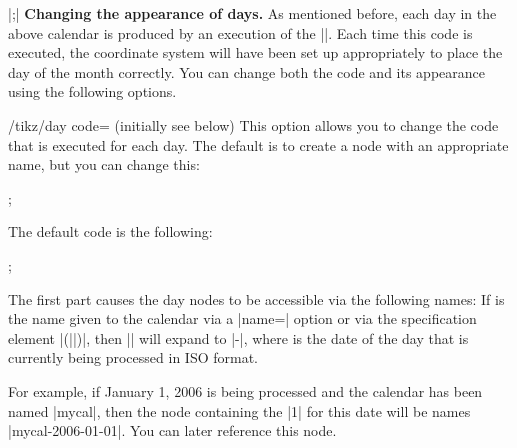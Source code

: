 \begin{command}{\calendar {}|;|}
    \medskip
    \textbf{Changing the appearance of days.}
    As mentioned before, each day in the above calendar is produced by an
    execution of the |\tikzdaycode|. Each time this code is executed, the
    coordinate system will have been set up appropriately to place the day of
    the month correctly. You can change both the code and its appearance using
    the following options.
    \begin{key}{/tikz/day code= (initially \normalfont see below)}
        This option allows you to change the code that is executed for each
        day. The default is to create a node with an appropriate name, but you
        can change this:
\begin{codeexample}[preamble={\usetikzlibrary{calendar}}]
\tikz \calendar[dates=2000-01-01 to 2000-01-31,week list,
                day code={\fill[blue] (0,0) circle (2pt);}];
\end{codeexample}
        The default code is the following:
\begin{codeexample}
\node[name=\pgfcalendarsuggestedname,every day]{\tikzdaytext};
\end{codeexample}
        The first part causes the day nodes to be accessible via the following
        names: If  is the name given to the calendar via a |name=|
        option or via the specification element |(||)|, then
        |\pgfcalendarsuggestedname| will expand to |-|,
        where  is the date of the day that is currently being
        processed in ISO format.

        For example, if January 1, 2006 is being processed and the calendar has
        been named |mycal|, then the node containing the |1| for this date will
        be names |mycal-2006-01-01|. You can later reference this node.
\begin{codeexample}[preamble={\usetikzlibrary{calendar}}]
\end{codeexample}
    \end{key}


\end{command}
